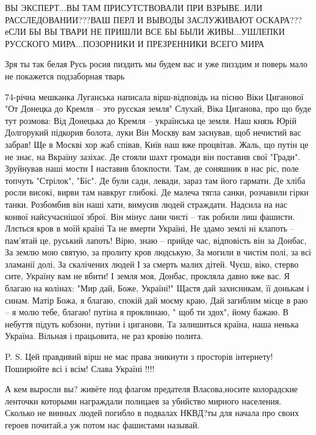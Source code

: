 ВЫ ЭКСПЕРТ...ВЫ ТАМ ПРИСУТСТВОВАЛИ ПРИ ВЗРЫВЕ..ИЛИ РАССЛЕДОВАНИИ???ВАШ ПЕРЛ И
ВЫВОДЫ ЗАСЛУЖИВАЮТ ОСКАРА???еСЛИ БЫ ВЫ ТВАРИ НЕ ПРИШЛИ ВСЕ БЫ БЫЛИ
ЖИВЫ...УШЛЕПКИ РУССКОГО МИРА...ПОЗОРНИКИ И ПРЕЗРЕННИКИ ВСЕГО МИРА

Зря ты так белая Русь росия пиздить мы будем вас и уже пизздим и поверь мало не
покажется подзаборная тварь

74-річна мешканка Луганська написала вірш-відповідь на пісню Віки Циганової "От Донецка до Кремля – это русская земля"
 Слухай, Віка Циганова, 
про що буде тут розмова: 
Від Донецька до Кремля – 
українська це земля. 
Наш князь Юрій Долгорукий
 підкорив болота, луки
 Він Москву вам заснував, 
щоб нечистий вас забрав! 
Ще в Москві хор жаб співав, 
Київ наш вже процвітав. 
Жаль, що путін це не знає, 
на Вкраїну зазіхає. 
Де стояли шахт громади 
він поставив свої "Гради". 
Зруйнував наші мости 
І наставив блокпости. 
Там, де соняшник в нас ріс, 
поле топчуть "Стрілок", "Біс". 
Де були сади, левади, 
зараз там його гармати. 
Де хліба росли високі, 
вирви там навкруг глибокі. 
Де малеча тягла санки, 
розчавили гірки танки. 
Розбомбив він наші хати, 
вимусив людей страждати. 
Надсила на нас конвої 
найсучаснішої зброї. 
Він мінує лани чисті – 
так робили лиш фашисти. 
Ллється кров в моїй країні 
Та не вмерти Україні, 
Не здамо землі ні клапоть – 
пам’ятай це, руський лапоть! 
Вірю, знаю – прийде час, 
відповість він за Донбас, 
За землю мою святую, 
за пролиту кров людськую, 
За могили в чистім полі, 
за всі зламанії долі, 
За скалічених людей 
І за смерть малих дітей. 
Чуєш, віко, стерво сите, 
Україну вам не вбити! 
І земля моя, Донбас, 
прокляла давно вже вас. 
Я благаю на колінах: 
"Мир дай, Боже, Україні!" 
Щастя дай захисникам, 
її донькам і синам. 
Матір Божа, я благаю, 
спокій дай моєму краю, 
Дай загиблим місце в раю – 
я молю тебе, благаю! 
путіна я проклинаю,
" щоб ти здох", йому бажаю. 
В небуття підуть кобзони, 
путіни і циганови, 
Та залишиться країна, 
наша ненька Україна. 
Вільная і працьовита, 
не раз кровію полита. 

P. S. Цей правдивий вірш не має права зникнути з просторів інтернету! Поширюйте всі і всім! Слава Україні !!!!

А кем выросли вы? живёте под флагом предателя Власова,носите колорадские
ленточки которыми награждали полицаев за убийство мирного населения. Сколько не
винных людей погибло в подвалах НКВД?ты для начала про своих героев почитай,а
уж потом нас фашистами называй.

